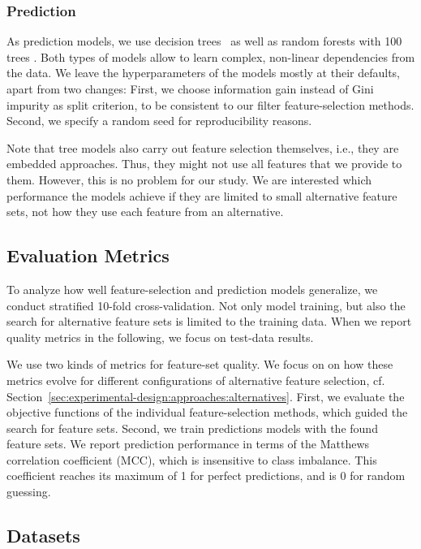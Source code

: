 \documentclass{article}
\theoremstyle{definition}
\begin{document}
\subsubsection{Prediction}
\label{sec:experimental-design:approaches:prediction}

As prediction models, we use decision trees~\cite{breiman1984classification} as well as random forests with 100 trees \cite{breiman2001random}.
Both types of models allow to learn complex, non-linear dependencies from the data.
We leave the hyperparameters of the models mostly at their defaults, apart from two changes:
First, we choose information gain instead of Gini impurity as split criterion, to be consistent to our filter feature-selection methods.
Second, we specify a random seed for reproducibility reasons.

Note that tree models also carry out feature selection themselves, i.e., they are embedded approaches.
Thus, they might not use all features that we provide to them.
However, this is no problem for our study.
We are interested which performance the models achieve if they are limited to small alternative feature sets, not how they use each feature from an alternative.

\subsection{Evaluation Metrics}
\label{sec:experimental-design:evaluation}

To analyze how well feature-selection and prediction models generalize, we conduct stratified 10-fold cross-validation.
Not only model training, but also the search for alternative feature sets is limited to the training data.
When we report quality metrics in the following, we focus on test-data results.

We use two kinds of metrics for feature-set quality.
We focus on on how these metrics evolve for different configurations of alternative feature selection, cf. Section~\ref{sec:experimental-design:approaches:alternatives}.
First, we evaluate the objective functions of the individual feature-selection methods, which guided the search for feature sets.
Second, we train predictions models with the found feature sets.
We report prediction performance in terms of the Matthews correlation coefficient (MCC), which is insensitive to class imbalance.
This coefficient reaches its maximum of 1 for perfect predictions, and is 0 for random guessing.

\subsection{Datasets}
\label{sec:experimental-design:datasets}
\end{document}
